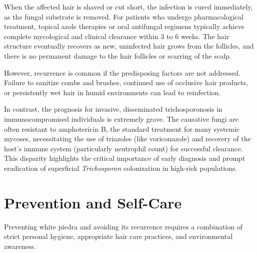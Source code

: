 When the affected hair is shaved or cut short, the infection is cured immediately, as the fungal substrate is removed. For patients who undergo pharmacological treatment, topical azole therapies or oral antifungal regimens typically achieve complete mycological and clinical clearance within 3 to 6 weeks. The hair structure eventually recovers as new, uninfected hair grows from the follicles, and there is no permanent damage to the hair follicles or scarring of the scalp.

However, recurrence is common if the predisposing factors are not addressed. Failure to sanitize combs and brushes, continued use of occlusive hair products, or persistently wet hair in humid environments can lead to reinfection.

In contrast, the prognosis for invasive, disseminated trichosporonosis in immunocompromised individuals is extremely grave. The causative fungi are often resistant to amphotericin B, the standard treatment for many systemic mycoses, necessitating the use of triazoles (like voriconazole) and recovery of the host's immune system (particularly neutrophil count) for successful clearance. This disparity highlights the critical importance of early diagnosis and prompt eradication of superficial \textit{Trichosporon} colonization in high-risk populations.

\section*{Prevention and Self-Care}
Preventing white piedra and avoiding its recurrence requires a combination of strict personal hygiene, appropriate hair care practices, and environmental awareness.

